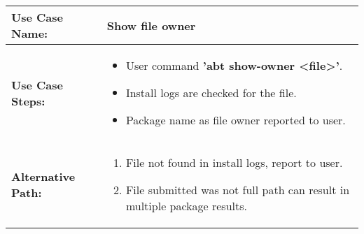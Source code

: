 \medskip

\begin{tabularx}{\linewidth}{|l|X|}
\hline
\textbf{Use Case Name:} & \textbf{Show file owner} \\
\hline
\textbf{Use Case Steps:} & 
\begin{minipage}{\linewidth} 
  \vspace{0.05em}
  \begin{itemize}
    \item User command \textbf{'abt show-owner <file>'}.
    \item Install logs are checked for the file.
    \item Package name as file owner reported to user.
  \end{itemize}
  \vspace{0.05em}
\end{minipage}
\\
\hline 
\textbf{Alternative Path:} &
\begin{minipage}{\linewidth}
  \vspace{0.05em} 
  \begin{enumerate}
    \item File not found in install logs, report to user.
    \item File submitted was not full path can result in multiple package results.
  \end{enumerate}
  \vspace{0.05em} 
\end{minipage}
\\
\hline
\end{tabularx}
